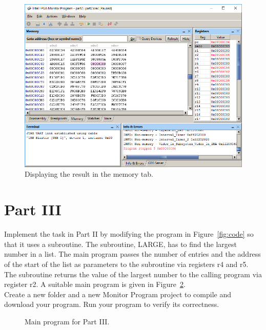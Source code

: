 \documentclass[epsfig,10pt,fullpage]{article}
\begin{document}
\begin{figure}[h]
	\begin{center}
	\includegraphics[scale=0.58]{figures/figureMP_mem.png}
	\end{center}
	\vspace{-0.5cm}\caption{Displaying the result in the memory tab.}
\label{fig:MP_mem}
\end{figure}

\newpage

\section*{Part III}
Implement the task in Part II by modifying the program in Figure~\ref{fig:code} so that it
uses a subroutine. The subroutine, LARGE, has to find the largest number in a list.
The main program passes the number of entries and the address of the start of the
list as parameters to the subroutine via registers r4 and r5.
The subroutine returns the value of the largest number to the calling program
via register r2. A suitable main program is given in Figure~\ref{fig:main}.
~\\


Create a new folder and a new Monitor Program project to compile and download your program.
Run your program to verify its correctness.

\begin{figure}[H]
\begin{center}
\begin{minipage}[t]{16.5 cm}

\end{minipage}
\end{center}
\caption{Main program for Part III.}
\label{fig:main}
\end{figure}
\end{document}

